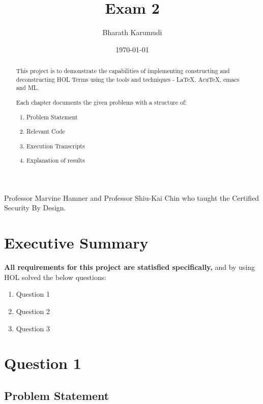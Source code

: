 \documentclass{report}
\title{Exam 2}
\author{Bharath Karumudi}
\date{\today}
\begin{document}
 \lstset{language=ML}
 \maketitle{}

 \begin{abstract}
   This project is to demonstrate the capabilities of implementing
   constructing and deconstructing HOL Terms using the tools and
   techniques - \LaTeX{}, AcuTeX, emacs and ML. 

   Each chapter documents the given problems with a structure of:
   \begin{enumerate}
   \item Problem Statement
   \item Relevant Code
   \item Execution Transcripts
   \item Explanation of results
   \end{enumerate}

 \end{abstract}


 \begin{acknowledgments}
  Professor Marvine Hamner and Professor Shiu-Kai Chin who taught the
  Certified Security By Design.
 \end{acknowledgments}

 \tableofcontents{}

 \chapter{Executive Summary}
 \label{cha:executive-summary}

\textbf{All requirements for this project are statisfied specifically,}
 and by using HOL solved the below questions:  

   \begin{enumerate}
   \item Question 1
   \item Question 2
   \item Question 3
   \end{enumerate}  




 \chapter{Question 1}
 \label{cha:ques1}
  
 \section{Problem Statement}
 \label{sec:problem-statement-1}
\end{document}
